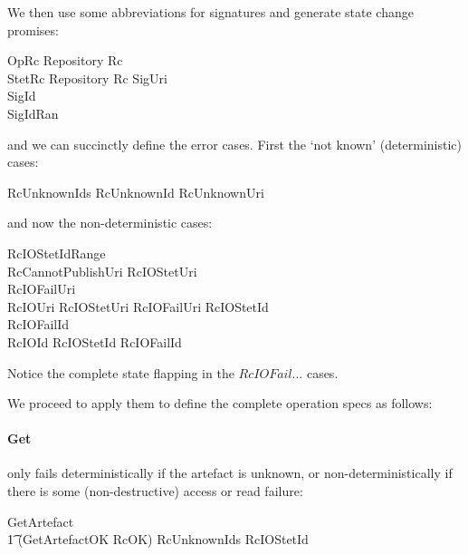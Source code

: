 \documentclass[a4paper,titlepage,twoside,12pt]{article}
\begin{document}
We then use some abbreviations for signatures and generate state change promises:
\begin{zed}
	OpRc  \Delta Repository \land Rc	\\
	StetRc  \Xi Repository \land Rc
\also
	SigUri 	\\
	SigId 	\\
	SigIdRan 	\\
\end{zed}
and we can succinctly define the error cases. First the `not known' (deterministic) cases:
\begin{zed}
	RcUnknownIds 
\also
	RcUnknownId 	
\also
	RcUnknownUri 	
\end{zed}
and now the non-deterministic cases:
\begin{zed}
	RcIOStetIdRange 	\\
	RcCannotPublishUri 
\also
	RcIOStetUri 	\\
	RcIOFailUri 	\\
	RcIOUri  RcIOStetUri \lor RcIOFailUri
\also
	RcIOStetId 	\\
	RcIOFailId 	\\
	RcIOId  RcIOStetId \lor RcIOFailId
\end{zed}
Notice the complete state flapping in the $RcIOFail$... cases.

We proceed to apply them to define the complete operation specs as follows:

\paragraph{Get}
only fails deterministically if the artefact is unknown, or non-deter\-min\-istically if there is some (non-destructive) access or read failure:
\begin{zed}
	GetArtefact  \\
	\t1 (GetArtefactOK \land RcOK) \lor RcUnknownIds \lor RcIOStetId
\end{zed}
\end{document}
